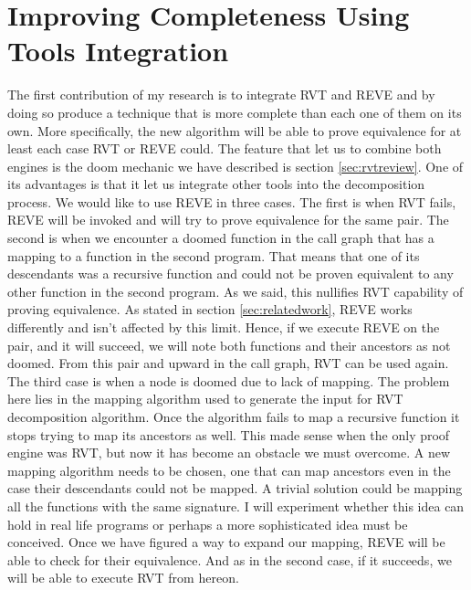 \section{Improving Completeness Using Tools Integration}
The first contribution of my research is to integrate RVT and REVE and by doing so produce a technique that is more complete than each one of them on its own. More specifically, the new algorithm will be able to prove equivalence for at least each case RVT or REVE could. The feature that let us to combine both engines is the doom mechanic we have described is section \ref{sec:rvtreview}. One of its advantages is that it let us integrate other tools into the decomposition process. We would like to use REVE in three cases. The first is when RVT fails, REVE will be invoked and will try to prove equivalence for the same pair. The second is when we encounter a doomed function in the call graph that has a mapping to a function in the second program. That means that one of its descendants was a recursive function and could not be proven equivalent to any other function in the second program. As we said, this nullifies RVT capability of proving equivalence. As stated in section \ref{sec:relatedwork}, REVE works differently and isn't affected by this limit. Hence, if we execute REVE on the pair, and it will succeed, we will note both functions and their ancestors as not doomed. From this pair and upward in the call graph, RVT can be used again. The third case is when a node is doomed due to lack of mapping. The problem here lies in the mapping algorithm used to generate the input for RVT decomposition algorithm. Once the algorithm fails to map a recursive function it stops trying to map its ancestors as well. This made sense when the only proof engine was RVT, but now it has become an obstacle we must overcome. A new mapping algorithm needs to be chosen, one that can map ancestors even in the case their descendants could not be mapped. A trivial solution could be mapping all the functions with the same signature. I will experiment whether this idea can hold in real life programs or perhaps a more sophisticated idea must be conceived. Once we have figured a way to expand our mapping, REVE will be able to check for their equivalence. And as in the second case, if it succeeds, we will be able to execute RVT from hereon. 

